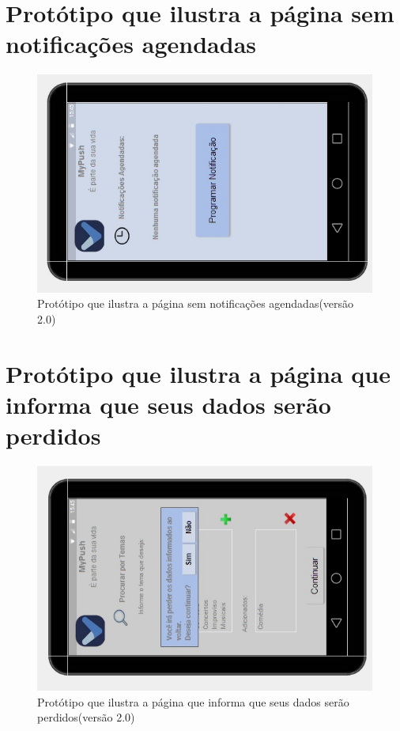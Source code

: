 \begin{apendicesenv}
    \pagebreak
      \section*{Protótipo que ilustra a página sem notificações agendadas}

    \begin{figure}[!htbp]
      \centering
      \includegraphics[scale=0.9, angle=-90]{editaveis/figuras/prototipo_alta_fidelidade_v2/2_9}
      \caption{Protótipo que ilustra a página sem notificações agendadas(versão 2.0)}
      \label{v2}
    \end{figure}
    
    \pagebreak
      \section*{Protótipo que ilustra a página que informa que seus dados serão perdidos}

    \begin{figure}[!htbp]
      \centering
      \includegraphics[scale=0.9, angle=-90]{editaveis/figuras/prototipo_alta_fidelidade_v2/2_10}
      \caption{Protótipo que ilustra a página que informa que seus dados serão perdidos(versão 2.0)}
      \label{v2}
    \end{figure}
    

\end{apendicesenv}
